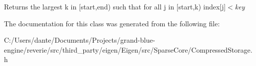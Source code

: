\begin{DoxyReturn}{Returns}
the largest {\ttfamily k} in \mbox{[}start,end) such that for all {\ttfamily j} in \mbox{[}start,k) index\mbox{[}{\ttfamily j}\mbox{]}$<${\itshape key} 
\end{DoxyReturn}


The documentation for this class was generated from the following file\+:\begin{DoxyCompactItemize}
\item 
C\+:/\+Users/dante/\+Documents/\+Projects/grand-\/blue-\/engine/reverie/src/third\+\_\+party/eigen/\+Eigen/src/\+Sparse\+Core/Compressed\+Storage.\+h\end{DoxyCompactItemize}
